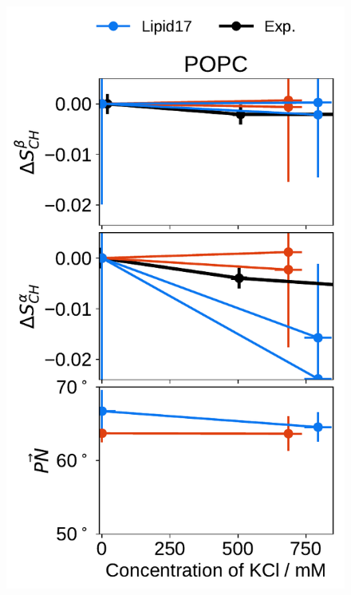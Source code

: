 \begin{figure}[tbp!] 
  \centering 
  \includegraphics[width=\figwidthsmall]{../img/ecc_pops/order_parameters_changes_ecc-lip_L14_A-B-PN-COO_POPC_kcl.pdf} 

\end{figure}
